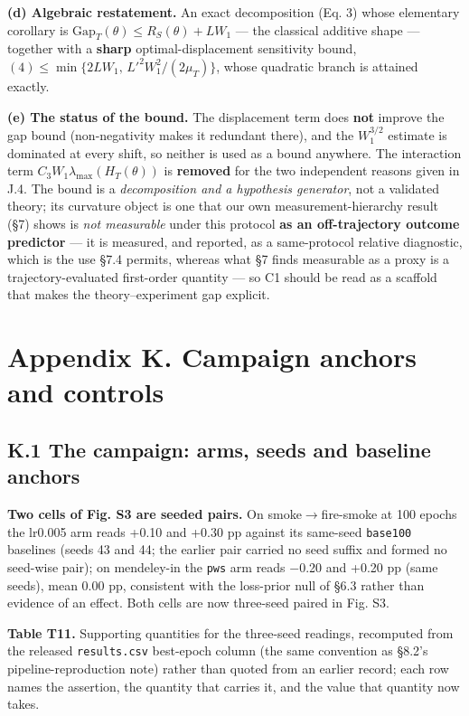 \documentclass[pdflatex,sn-mathphys-ay]{sn-jnl}
\begin{document}
\textbf{(d) Algebraic restatement.} An exact decomposition (Eq. 3) whose elementary corollary is $\mathrm{Gap}_T(\theta)\le R_S(\theta)+LW_1$ --- the classical additive shape --- together with a \textbf{sharp} optimal-displacement sensitivity bound, $(4)\le\min\{2LW_1,\,L'^2W_1^2/(2\mu_T)\}$, whose quadratic branch is attained exactly.

\textbf{(e) The status of the bound.} The displacement term does \textbf{not} improve the gap bound (non-negativity makes it redundant there), and the $W_1^{3/2}$ estimate is dominated at every shift, so neither is used as a bound anywhere. The interaction term $C_3W_1\lambda_{\max}(H_T(\theta))$ is \textbf{removed} for the two independent reasons given in J.4. The bound is a \emph{decomposition and a hypothesis generator}, not a validated theory; its curvature object is one that our own measurement-hierarchy result (\S{}7) shows is \emph{not measurable} under this protocol \textbf{as an off-trajectory outcome predictor} --- it is measured, and reported, as a same-protocol relative diagnostic, which is the use \S{}7.4 permits, whereas what \S{}7 finds measurable as a proxy is a trajectory-evaluated first-order quantity --- so C1 should be read as a scaffold that makes the theory--experiment gap explicit.

\section*{Appendix K. Campaign anchors and controls}

\subsection*{K.1 The campaign: arms, seeds and baseline anchors}

\textbf{Two cells of Fig. S3 are seeded pairs.} On smoke\ensuremath{\rightarrow}fire-smoke at 100 epochs the lr0.005 arm reads +0.10 and +0.30 pp against its same-seed \texttt{base100} baselines (seeds 43 and 44; the earlier pair carried no seed suffix and formed no seed-wise pair); on mendeley-in the \texttt{pws} arm reads \ensuremath{-}0.20 and +0.20 pp (same seeds), mean 0.00 pp, consistent with the loss-prior null of \S{}6.3 rather than evidence of an effect. Both cells are now three-seed paired in Fig. S3.

\textbf{Table T11.} Supporting quantities for the three-seed readings, recomputed from the released \texttt{results.csv} best-epoch column (the same convention as \S{}8.2's pipeline-reproduction note) rather than quoted from an earlier record; each row names the assertion, the quantity that carries it, and the value that quantity now takes.
\end{document}
